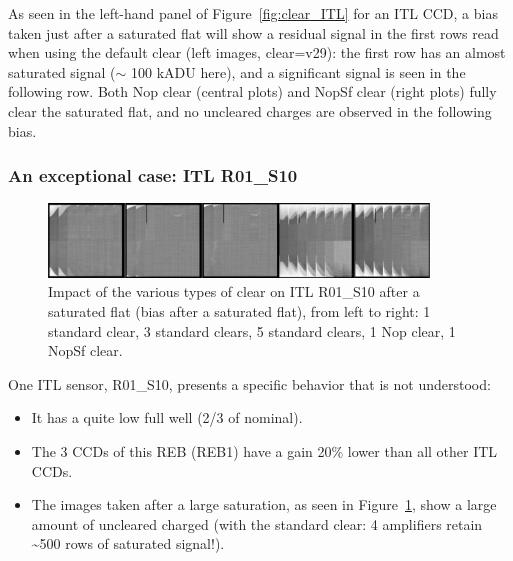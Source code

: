 As seen in the left-hand panel of Figure~\ref{fig:clear_ITL}
for an ITL CCD, a bias taken just after a saturated flat will show a
residual signal in the first rows read when using the default clear
(left images, clear=v29): the first row has an almost saturated signal
($\sim$ 100 kADU here), and a significant signal is seen in
the following row. Both Nop clear (central plots) and NopSf clear
(right plots) fully clear the saturated flat, and no uncleared charges
are observed in the following bias.

\subsubsection{An exceptional case: ITL R01\_S10}\label{results-on-itl-r01s10}

\begin{figure}
\begin{centering}
\includegraphics[width=0.9\textwidth]{figures/Clear_R01_S10.png}
\end{centering}
\caption{Impact of the various types of clear on ITL
R01\_S10 after a saturated flat (bias after a saturated flat), from left
to right: 1 standard clear, 3 standard clears, 5 standard clears, 1 Nop
clear, 1 NopSf clear.}
\label{fig:clears_R01_S10}
\end{figure}


One ITL sensor, R01\_S10,
presents a specific behavior that is not understood:

\begin{itemize}
\tightlist
\item
  It has a quite low full well (2/3 of nominal).
\item
  The 3 CCDs of this REB (REB1) have a gain 20\% lower than all other ITL CCDs.
\item
  The images taken after a large saturation, as seen in Figure~\ref{fig:clears_R01_S10},
  show a large amount of uncleared charged (with the standard clear: 4
  amplifiers retain \textasciitilde500 rows of saturated signal!).
\end{itemize}

